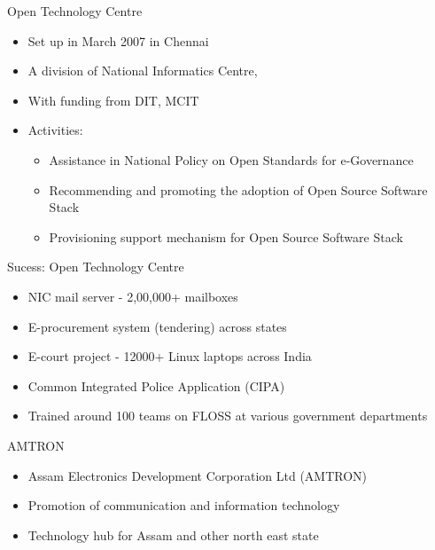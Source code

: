 \documentclass{beamer}
\begin{document}
\begin{frame}{Open Technology Centre}
    \begin{itemize}
      \item Set up in March 2007 in Chennai
       \item A division of National Informatics Centre, 
        \item With funding from DIT, MCIT
         \item Activities: 
              \begin{itemize}
                  \item Assistance in National Policy on Open Standards for e-Governance
                  \item Recommending and promoting the adoption of Open Source Software Stack
                  \item Provisioning support mechanism for Open Source Software Stack
               \end{itemize}
    \end{itemize}
\end{frame}
\begin {frame} {Sucess: Open Technology Centre}
   \begin{itemize}
         \item NIC mail server - 2,00,000+ mailboxes
          \item E-procurement system (tendering) across states 
          \item E-court project - 12000+ Linux laptops across India
          \item Common Integrated Police Application (CIPA)
          \item Trained around 100 teams on FLOSS at various government departments
    \end{itemize}
\end{frame}

\begin{frame} {AMTRON}
     \begin {itemize}
          \item Assam Electronics Development Corporation Ltd (AMTRON)
          \item Promotion of communication and information technology
           \item Technology hub for Assam and other north east state
      \end {itemize}
\end{frame}
\end{document}
